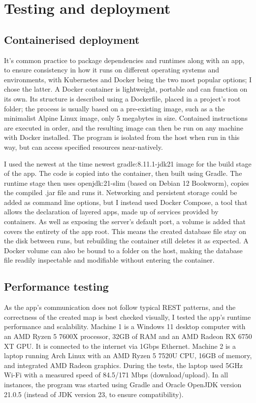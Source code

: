 \chapter{Testing and deployment}

\section{Containerised deployment}
It's common practice to package dependencies and runtimes along with an app, to ensure consistency in how it runs on different operating systems and environments, with Kubernetes and Docker being the two most popular options; I chose the latter. A Docker container is lightweight, portable and can function on its own. Its structure is described using a Dockerfile, placed in a project's root folder; the process is usually based on a pre-existing image, such as a the minimalist Alpine Linux image, only 5 megabytes in size. Contained instructions are executed in order, and the resulting image can then be run on any machine with Docker installed. The program is isolated from the host when run in this way, but can access specified resources near-natively.

I used the newest at the time newest gradle:8.11.1-jdk21 image for the build stage of the app. The code is copied into the container, then built using Gradle. The runtime stage then uses openjdk:21-slim (based on Debian 12 Bookworm), copies the compiled .jar file and runs it. Networking and persistent storage could be added as command line options, but I instead used Docker Compose, a tool that allows the declaration of layered apps, made up of services provided by containers. As well as exposing the server's default port, a volume is added that covers the entirety of the app root. This means the created database file stay on the disk between runs, but rebuilding the container still deletes it as expected. A Docker volume can also be bound to a folder on the host, making the database file readily inspectable and modifiable without entering the container.

\section{Performance testing}

As the app's communication does not follow typical REST patterns, and the correctness of the created map is best checked visually, I tested the app's runtime performance and scalability.
Machine 1 is a Windows 11 desktop computer with an AMD Ryzen 5 7600X processor, 32GB of RAM and an AMD Radeon RX 6750 XT GPU. It is connected to the internet via 1Gbps Ethernet. Machine 2 is a laptop running Arch Linux with an AMD Ryzen 5 7520U CPU, 16GB of memory, and integrated AMD Radeon graphics. During the tests, the laptop used 5GHz Wi-Fi with a measured speed of 84.5/171 Mbps (download/upload). In all instances, the program was started using Gradle and Oracle OpenJDK version 21.0.5 (instead of JDK version 23, to ensure compatibility). 

